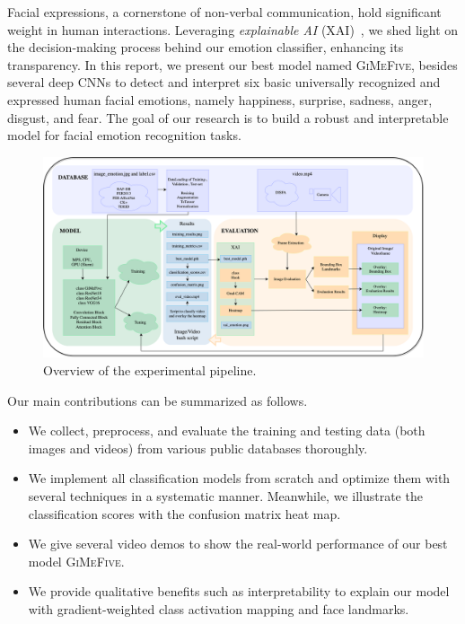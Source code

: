 Facial expressions, a cornerstone of non-verbal communication, 
hold significant weight in human interactions. 
Leveraging \textit{explainable AI} (XAI)~\cite{olah2018building,YinTLS019,Malik0R21}, 
we shed light on the decision-making process behind our emotion classifier, 
enhancing its transparency. 
In this report, we present our best model named \textsc{GiMeFive}, 
besides several deep CNNs to detect and interpret six basic universally recognized and expressed human facial emotions, 
namely happiness, surprise, sadness, anger, disgust, and fear. 
The goal of our research is to build a robust and interpretable model for facial emotion recognition tasks. 

\begin{figure}[ht]
  \centering
   \includegraphics[width=\linewidth]{pipeline.png}
   \caption{Overview of the experimental pipeline.} 
   \label{fig:pipeline}
\end{figure}

Our main contributions can be summarized as follows. 
\begin{itemize}
  \item We collect, preprocess, and evaluate the training and testing data 
  (both images and videos) from various public databases thoroughly. 
  \item We implement all classification models from scratch and optimize them with several techniques in a systematic manner. 
  Meanwhile, we illustrate the classification scores with the confusion matrix heat map. 
  \item We give several video demos to show the real-world performance of our best model \textsc{GiMeFive}. 
  \item We provide qualitative benefits such as interpretability to explain our model with gradient-weighted class activation mapping and face landmarks.
\end{itemize}

